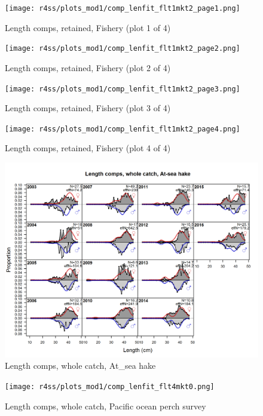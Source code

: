 \documentclass[12pt,]{article}
\begin{document}
\begin{figure}
\centering
\texttt{[image: r4ss/plots\_mod1/comp\_lenfit\_flt1mkt2\_page1.png]}
\caption{Length comps, retained, Fishery (plot 1 of 4)
\label{fig:length_fits}}
\end{figure}

\begin{figure}
\centering
\texttt{[image: r4ss/plots\_mod1/comp\_lenfit\_flt1mkt2\_page2.png]}
\caption{Length comps, retained, Fishery (plot 2 of 4)
\label{fig:length_fits}}
\end{figure}

\begin{figure}
\centering
\texttt{[image: r4ss/plots\_mod1/comp\_lenfit\_flt1mkt2\_page3.png]}
\caption{Length comps, retained, Fishery (plot 3 of 4)
\label{fig:length_fits}}
\end{figure}

\begin{figure}
\centering
\texttt{[image: r4ss/plots\_mod1/comp\_lenfit\_flt1mkt2\_page4.png]}
\caption{Length comps, retained, Fishery (plot 4 of 4)
\label{fig:length_fits}}
\end{figure}

\begin{figure}
\centering
\includegraphics{r4ss/plots_mod1/comp_lenfit_flt2mkt0.png}
\caption{Length comps, whole catch, At\_sea hake
\label{fig:length_fits}}
\end{figure}

\begin{figure}
\centering
\texttt{[image: r4ss/plots\_mod1/comp\_lenfit\_flt4mkt0.png]}
\caption{Length comps, whole catch, Pacific ocean perch survey
\label{fig:length_fits}}
\end{figure}
\end{document}
